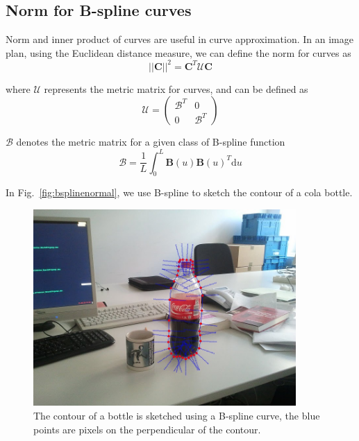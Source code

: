 \subsection{Norm for B-spline curves}
\label{sec:nbc}

Norm and inner product of curves are useful in curve approximation. In
an image plan, using the Euclidean distance measure, we can define the
norm for curves as 
\begin{equation}
  \label{eq:4.13}
  \left| \left| \mathbf{C} \right|\right|^2  = \mathbf{C}^T\mathcal{U}\mathbf{C}
\end{equation}

where $\mathcal{U}$ represents the metric matrix for curves, and can be
defined as 
\begin{equation}
  \label{eq:4.14}
  \mathcal{U} =   \begin{pmatrix}
\mathcal{B}^T & 0 \\
0 &\mathcal{B}^T
  \end{pmatrix}  
\end{equation}

$\mathcal{B}$ denotes the metric matrix for a given class of B-spline
function
\begin{equation}
  \label{eq:4.15}
  \mathcal{B}   = \frac{1}{L} \int_0^L \mathbf{B}(u)\mathbf{B}(u)^T \mathrm{d}u
\end{equation}

In Fig.~\ref{fig:bsplinenormal}, we use B-spline to sketch the contour of a
cola bottle.
\begin{figure}[htb]
  \centering
  \includegraphics[width=10cm]{images/bsplinenormal.jpg}
  \caption{The contour of a bottle is sketched using a B-spline
    curve, the blue points are pixels on the perpendicular of the contour.}
\label{fig:bspline}
\end{figure}


